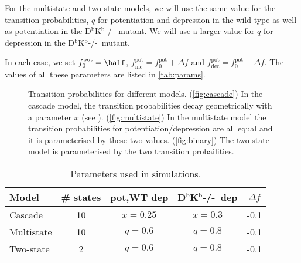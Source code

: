 \documentclass[12pt]{article}
\newcommand{\pot}{^{\text{pot}}}
\newcommand{\norm}{_0}
\newcommand{\inc}{_{\text{inc}}}
\newcommand{\dec}{_{\text{dec}}}
\newcommand{\Kn}{D$^\mathrm{b}$K$^\mathrm{b}$-/-}
\begin{document}
For the multistate and two state models, we will use the same value for the transition probabilities, $q$ for potentiation and depression in the wild-type as well as potentiation in the \Kn\ mutant. We will use a larger value for $q$ for depression in the \Kn\ mutant.

In each case, we set $f\pot\norm=\half$, $f\pot\inc=f\pot\norm+\Delta f$ and $f\pot\dec=f\pot\norm-\Delta f$. The values of all these parameters are listed in \autoref{tab:params}.

\begin{figure}
 \begin{center}
 \begin{myenuma}
  \item{}\label{fig:cascade}\hspace{0.5cm}
  \item{}\label{fig:multistate}\hspace{0.5cm}
  \item{}\label{fig:binary}
 \end{myenuma}
 \end{center}
  \caption{Transition probabilities for different models. (\ref{fig:cascade}) In the cascade model, the transition probabilities decay geometrically with a parameter $x$ (see \cite{Fusi2005cascade}). (\ref{fig:multistate}) In the multistate model the transition probabilities for potentiation/depression are all equal and it is parameterised by these two values. (\ref{fig:binary}) The two-state model is parameterised by the two transition probailities.}\label{fig:models}
\end{figure}

\begin{table}
 \begin{center}
  \begin{tabular}{|l|c|c|c|c|}
    \hline
    Model & \# states & pot,WT dep & \Kn\ dep & $\Delta f$\\
    \hline
    Cascade & 10 & $x=0.25$ & $x=0.3$ & -0.1 \\
    Multistate & 10 & $q=0.6$ & $q=0.8$ & -0.1 \\
    Two-state & 2 & $q=0.6$ & $q=0.8$ & -0.1 \\
    \hline
  \end{tabular}
 \end{center}
  \caption{Parameters used in simulations.}\label{tab:params}
\end{table}
\end{document}
